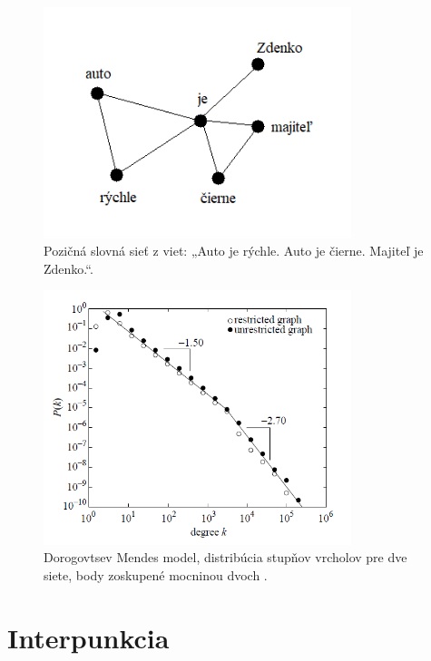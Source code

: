 \begin{figure}
    \centerline{\includegraphics[width=0.8\textwidth]{images/wan.png}}
    \caption[Pozičná slovná sieť.]{Pozičná slovná sieť z viet: „Auto je rýchle. Auto je čierne. Majiteľ je Zdenko.“.}
    \label{obr:wan}
\end{figure}

\begin{figure}
    \centerline{\includegraphics[width=0.8\textwidth]{images/degdist.png}}
    \caption[Distribúcia stupňov vrcholov, Dorogovtsev Mendes model]{Dorogovtsev Mendes model, distribúcia stupňov vrcholov pre dve siete,
    body zoskupené mocninou dvoch \cite{cancho2001small} .}
    \label{obr:degdist}
\end{figure}

\clearpage

\section{Interpunkcia}\label{sec:punctuation}

